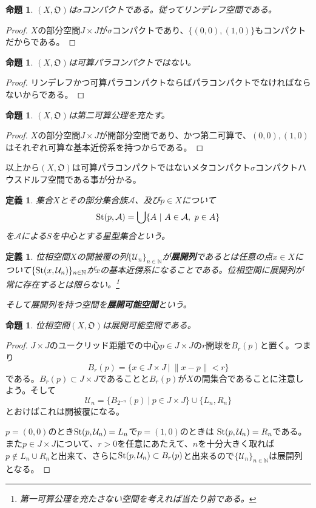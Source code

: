 \documentclass[leqno]{jsarticle}
\newtheorem{prop}[thm]{命題}
\newtheorem{df}[thm]{定義}
\newcommand{\nn}{\mathbb{N}}
\newcommand{\s}{\text{{\rm St}}}
\begin{document}
\begin{prop}
$(X,\mathfrak{O})$は$\sigma$コンパクトである。従ってリンデレフ空間である。
\end{prop}
\begin{proof}
$X$の部分空間$J\times J$が$\sigma$コンパクトであり、$\{(0,0),(1,0)\}$もコンパクトだからである。
\end{proof}



\begin{prop}
$(X,\mathfrak{O})$は可算パラコンパクトではない。
\end{prop}
\begin{proof}
リンデレフかつ可算パラコンパクトならばパラコンパクトでなければならないからである。
\end{proof}


\begin{prop}
$(X,\mathfrak{O})$は第二可算公理を充たす。
\end{prop}
\begin{proof}
$X$の部分空間$J\times J$が開部分空間であり、かつ第二可算で、$(0,0),(1,0)$はそれぞれ可算な基本近傍系を持つからである。
\end{proof}



以上から$(X,\mathfrak{O})$は可算パラコンパクトではないメタコンパクト$\sigma$コンパクトハウスドルフ空間である事が分かる。


\begin{df}
集合$X$とその部分集合族$\mathcal{A}$、及び$p\in X$について
\[
\s(p,\mathcal{A})=\bigcup\{A\ |\ A\in \mathcal{A},\ p\in A\}
\]
を$\mathcal{A}$による$S$を中心とする星型集合という。
\end{df}


\begin{df}
位相空間$X$の開被覆の列$\{\mathcal{U}_{n}\}_{n\in \nn}$が{\bf 展開列}であるとは任意の点$x\in X$について$\{\s(x,\mathcal{U}_{n})\}_{n\in \nn}$が$x$の基本近傍系になることである。位相空間に展開列が常に存在するとは限らない。\footnote{第一可算公理を充たさない空間を考えれば当たり前である。}
\par
そして展開列を持つ空間を{\bf 展開可能空間}という。
\end{df}


\begin{prop}
位相空間$(X,\mathfrak{O})$は展開可能空間である。
\end{prop}
\begin{proof}
$J\times J$のユークリッド距離での中心$p\in J\times J$の$r$開球を$B_r(p)$と置く。つまり
\[
B_r(p)=\{x\in J\times J\ |\ \|x-p\|<r\}
\]
である。$B_r(p)\subset J\times J$であることと$B_r(p)$が$X$の開集合であることに注意しよう。そして
\[
\mathcal{U}_n=\{B_{2^{-n}}(p)\ |\ p\in J\times J\}\cup \{L_n,R_n\}
\]
とおけばこれは開被覆になる。\par
$p=(0,0)$のとき$\s(p,\mathcal{U}_n)=L_n$で$p=(1,0)$のときは
$\s(p,\mathcal{U}_n)=R_n$である。
また$p\in J\times J$について、$r>0$を任意にあたえて、$n$を十分大きく取れば$p\not\in L_n\cup R_n$と出来て、さらに$\s(p,\mathcal{U}_n)\subset B_r(p)$と出来るので$\{\mathcal{U}_n\}_{n\in \nn}$は展開列となる。
\end{proof}
\end{document}

